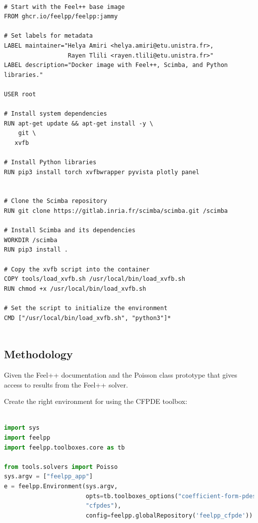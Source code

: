 \documentclass[12pt]{article}
\begin{document}
\begin{lstlisting}[language=docker,caption={Dockerfile for Feel++, Scimba, and Python libraries.},frame=single, backgroundcolor=\color{gray!10}, basicstyle=\footnotesize,rulecolor=\color{blue}, framexleftmargin=3pt, commentstyle=\color{mygreen}, keywordstyle=\color{blue}]

# Start with the Feel++ base image
FROM ghcr.io/feelpp/feelpp:jammy

# Set labels for metadata
LABEL maintainer="Helya Amiri <helya.amiri@etu.unistra.fr>, 
                  Rayen Tlili <rayen.tlili@etu.unistra.fr>"
LABEL description="Docker image with Feel++, Scimba, and Python libraries."

USER root

# Install system dependencies
RUN apt-get update && apt-get install -y \
    git \
   xvfb

# Install Python libraries
RUN pip3 install torch xvfbwrapper pyvista plotly panel


# Clone the Scimba repository
RUN git clone https://gitlab.inria.fr/scimba/scimba.git /scimba

# Install Scimba and its dependencies
WORKDIR /scimba
RUN pip3 install .

# Copy the xvfb script into the container
COPY tools/load_xvfb.sh /usr/local/bin/load_xvfb.sh
RUN chmod +x /usr/local/bin/load_xvfb.sh

# Set the script to initialize the environment
CMD ["/usr/local/bin/load_xvfb.sh", "python3"]*


\end{lstlisting}



\newpage
\subsection{Methodology}
Given the Feel++ documentation and the Poisson class prototype that gives access to results from the Feel++ solver.

Create the right environment for using the CFPDE toolbox:
\begin{lstlisting}[language=python,caption={},frame=single, backgroundcolor=\color{gray!10}, basicstyle=\footnotesize,rulecolor=\color{blue}, framexleftmargin=3pt, commentstyle=\color{mygreen}, keywordstyle=\color{blue}]

import sys
import feelpp
import feelpp.toolboxes.core as tb

from tools.solvers import Poisso
sys.argv = ["feelpp_app"]
e = feelpp.Environment(sys.argv,
                       opts=tb.toolboxes_options("coefficient-form-pdes", 
                       "cfpdes"),
                       config=feelpp.globalRepository('feelpp_cfpde'))

\end{lstlisting}
\end{document}
